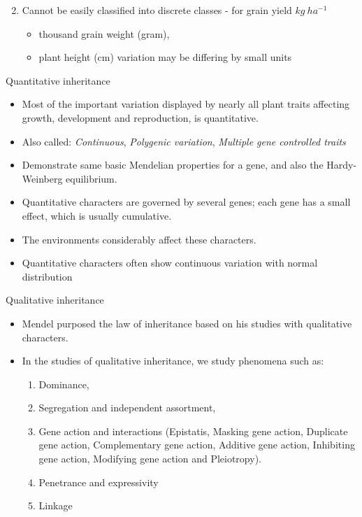 \documentclass[11pt,dvipsnames,ignorenonframetext,aspectratio=169]{beamer}
\providecommand{\tightlist}{%
  \setlength{\itemsep}{0pt}\setlength{\parskip}{0pt}}
\begin{document}
\begin{frame}{}
\protect\hypertarget{section-6}{}
\begin{enumerate}
\setcounter{enumi}{1}
\tightlist
\item
  Cannot be easily classified into discrete classes - for grain yield
  \(kg~ha^{-1}\)

  \begin{itemize}
  \tightlist
  \item
    thousand grain weight (gram),
  \item
    plant height (cm) variation may be differing by small units
  \end{itemize}
\end{enumerate}
\end{frame}

\begin{frame}{Quantitative inheritance}
\protect\hypertarget{quantitative-inheritance}{}
\begin{itemize}
\tightlist
\item
  Most of the important variation displayed by nearly all plant traits
  affecting growth, development and reproduction, is quantitative.
\item
  Also called: \emph{Continuous}, \emph{Polygenic variation},
  \emph{Multiple gene controlled traits}
\item
  Demonstrate same basic Mendelian properties for a gene, and also the
  Hardy-Weinberg equilibrium.
\item
  Quantitative characters are governed by several genes; each gene has a
  small effect, which is usually cumulative.
\item
  The environments considerably affect these characters.
\item
  Quantitative characters often show continuous variation with normal
  distribution
\end{itemize}
\end{frame}

\begin{frame}{Qualitative inheritance}
\protect\hypertarget{qualitative-inheritance}{}
\begin{itemize}
\tightlist
\item
  Mendel purposed the law of inheritance based on his studies with
  qualitative characters.
\item
  In the studies of qualitative inheritance, we study phenomena such as:

  \begin{enumerate}
  \tightlist
  \item
    Dominance,
  \item
    Segregation and independent assortment,
  \item
    Gene action and interactions (Epistatis, Masking gene action,
    Duplicate gene action, Complementary gene action, Additive gene
    action, Inhibiting gene action, Modifying gene action and
    Pleiotropy).
  \item
    Penetrance and expressivity
  \item
    Linkage
  \end{enumerate}
\end{itemize}
\end{frame}
\end{document}
